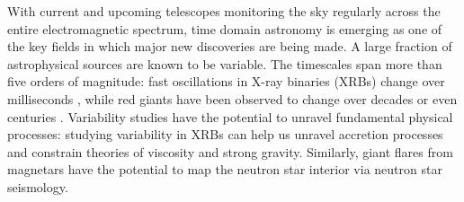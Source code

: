 \documentclass[12pt]{emulateapj}
\begin{document}
With current and upcoming telescopes monitoring the sky regularly across the entire electromagnetic spectrum, time domain astronomy is emerging as one of the key fields in which major 
new discoveries are being made.  A large fraction of astrophysical sources are known to be variable. The timescales span more than five orders of magnitude: fast oscillations in 
X-ray binaries (XRBs) change over milliseconds \citep[e.g.][]{xrb_khzqpos}, while red giants have been observed to change over decades or even centuries \citep[e.g.][]{dasch_giants}. 
Variability studies have the potential to unravel fundamental physical processes: studying variability in XRBs can help us unravel accretion processes and constrain theories of viscosity and strong gravity. 
Similarly, giant flares from magnetars have the potential to map the neutron star interior via neutron star seismology. 
\end{document}
